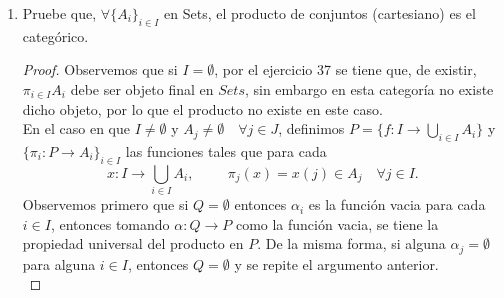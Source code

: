 \documentclass{article}
\begin{document}
\begin{enumerate}[label=\textbf{Ej \arabic*.}]
\textbf{Notación:} En una categoría $\mathscr{C}$ con objeto cero, para cada $\{A_i\}_{i\in I}$ en $\mathscr{C}$, se define la familia de morfismos
$\delta^A_i:=\{\delta^A_{ij}:A_i\to A_j\}_{(i,j)\in I^2}$ en $\mathscr{C}$\\

\centerline{
$\delta^A_{i,j}:=\left\{ 
\begin{array}{c} 0\quad \text{si}\quad i\neq j\\ 1_{A_j}\quad \text{si}\quad i=j\,.
\end{array}\right .$
}
\begin{proof}
Como $I=\emptyset$ por vacuidad se tiene que para todo $C\in \mathscr{C}$, se tiene una familia $\{\alpha_i:C\to A_i\}_{i\in I}$ en $\mathscr{C}$.
Entonces (puesto que el producto existe) existe una única $\alpha:C\to P$ tal que $\pi_i\alpha=\alpha_i\quad \forall i\in I$, donde $\pi_i$ 
son los morfismos que cumplen la propiedad universal del producto. Si existiera otro morfismo $\gamma:C\to P$ éste cumpliría por vacuidad que 
$\pi_i\gamma=\alpha_i\quad \forall i\in I$, y como existe un único morfismo con esta propiedad, tenemos que para cada objeto $C\in \mathscr{C}\quad 
\big|\operatorname{Hom}_{\mathscr{C}}(C,P)\big|=1$ por lo que $P$ es objeto final.
\end{proof}
\item Pruebe que, $\forall \{A_i\}_{i\in I}$ en Sets, el producto de conjuntos (cartesiano) es el categórico. 

\begin{proof}
Observemos que si $I=\emptyset$, por el ejercicio 37 se tiene que, de existir, $\pi_{i\in I}A_i$ debe ser objeto final en $Sets$, sin embargo en esta 
categoría no existe dicho objeto, por lo que el producto no existe en este caso.\\

En el caso en que $I\neq \emptyset$ y $A_j\neq \emptyset\quad \forall j\in J$, definimos $P=\{f:I\to \displaystyle\bigcup_{i\in I}A_i\}$ y
$ \{\pi_i:P\to A_i\}_{i\in I}$ las funciones tales que para cada 
\[x:I\to \displaystyle\bigcup_{i\in I}A_i, \hspace{1cm} \pi_j(x)=x(j)\in A_j\quad \forall j\in I.
\]
Observemos primero que si $Q=\emptyset$ entonces $\alpha_i$ es la función vacia para cada $i\in I$, entonces tomando $\alpha:Q\to P$ como la función
vacia, se tiene la propiedad universal del producto en $P$. De la misma forma, si alguna $\alpha_j=\emptyset$ para alguna $i\in I$, 
entonces $Q=\emptyset$ y se repite el argumento anterior.\\


\end{proof}
\end{enumerate}
\end{document}

